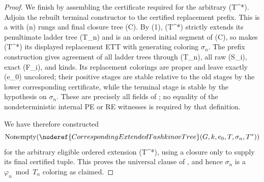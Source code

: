 \begin{proof}
We finish by assembling the certificate required for the arbitrary
(T^*).  Adjoin the rebuilt terminal constructor to the certified
replacement prefix.  This is a  with (n)
rungs and final closure tree (C).  By (1), (T^*) strictly extends its
penultimate ladder tree (T_n) and is an ordered initial segment of (C),
so  makes (T^*) its displayed replacement
ETT with generating coloring \(\sigma_n\).  The prefix construction gives
agreement of all ladder trees through (T_n), all raw (S_i), exact
(F_i), and kinds.  Its replacement colorings are proper and leave
exactly (e_0) uncolored; their positive stages are stable relative to
the old stages by the lower corresponding certificate, while the terminal
stage is stable by the hypothesis on \(\sigma_n\).  These are precisely
all fields of ; no equality
of the nondeterministic internal PE or RE witnesses is required by that
definition.

We have therefore constructed
\[
 \operatorname{Nonempty}
   (\noderef{CorrespondingExtendedTashkinovTree}
       (G,k,e_0,T,\sigma_n,T^*))
\]
for the arbitrary eligible ordered extension (T^*), using a closure
only to supply its final certified tuple.  This proves the universal clause
of , and hence \(\sigma_n\) is a
\(\varphi_n\bmod T_n\) coloring as claimed.
\end{proof}
